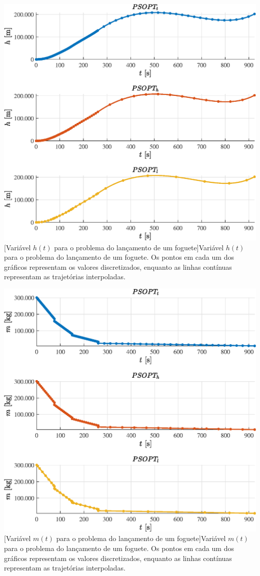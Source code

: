 \noindent
\begin{minipage}{\textwidth}
	\vspace{\onelineskip}
	\centering
	\includegraphics[width=0.7\linewidth]{fig/resultados/foguete/traj/x/h}
	[Variável $h(t)$ para o problema do lançamento de um foguete]{Variável $h(t)$ para o problema do lançamento de um foguete. Os pontos em cada um dos gráficos representam os valores discretizados, enquanto as linhas contínuas representam as trajetórias interpoladas.}
	\label{fig:foguete:x:h}
	\vspace{\onelineskip}
\end{minipage}

\noindent
\begin{minipage}{\textwidth}
	\vspace{\onelineskip}
	\centering
	\includegraphics[width=0.7\linewidth]{fig/resultados/foguete/traj/x/m}
	[Variável $m(t)$ para o problema do lançamento de um foguete]{Variável $m(t)$ para o problema do lançamento de um foguete. Os pontos em cada um dos gráficos representam os valores discretizados, enquanto as linhas contínuas representam as trajetórias interpoladas.}
	\label{fig:foguete:x:m}
	\vspace{\onelineskip}
\end{minipage}

